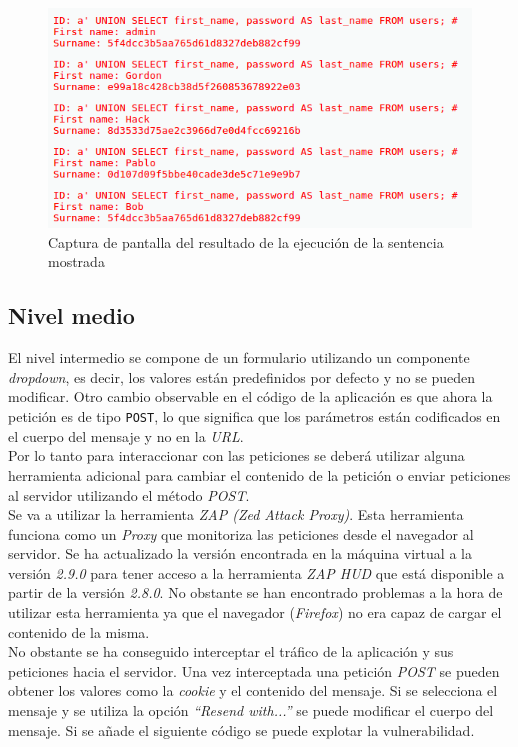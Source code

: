 \documentclass{article}
\begin{document}
\begin{figure}[h!]
    \centering
    \includegraphics[scale=0.8]{images/sql_injection_password_hash.png}
    \caption{Captura de pantalla del resultado de la ejecución de la sentencia mostrada}
    \label{fig:sql_injection_low}
\end{figure}


\subsection{Nivel medio}
\label{section:sqli_medium}

El nivel intermedio se compone de un formulario utilizando un componente \textit{dropdown}, es decir, los valores están predefinidos por defecto y no se pueden modificar. Otro cambio observable en el código de la aplicación es que ahora la petición es de tipo \texttt{POST}, lo que significa que los parámetros están codificados en el cuerpo del mensaje y no en la \textit{URL}.\\
Por lo tanto para interaccionar con las peticiones se deberá utilizar alguna herramienta adicional para cambiar el contenido de la petición o enviar peticiones al servidor utilizando el método \textit{POST}.\\

Se va a utilizar la herramienta \textit{ZAP (Zed Attack Proxy)}. Esta herramienta funciona como un \textit{Proxy} que monitoriza las peticiones desde el navegador al servidor. Se ha actualizado la versión encontrada en la máquina virtual a la versión \textit{2.9.0} para tener acceso a la herramienta \textit{ZAP HUD} que está disponible a partir de la versión \textit{2.8.0}. No obstante se han encontrado problemas a la hora de utilizar esta herramienta ya que el navegador (\textit{Firefox}) no era capaz de cargar el contenido de la misma.\\
No obstante se ha conseguido interceptar el tráfico de la aplicación y sus peticiones hacia el servidor. Una vez interceptada una petición \textit{POST} se pueden obtener los valores como la \textit{cookie} y el contenido del mensaje. Si se selecciona el mensaje y se utiliza la opción \textit{``Resend with...''} se puede modificar el cuerpo del mensaje. Si se añade el siguiente código se puede explotar la vulnerabilidad.
\end{document}

